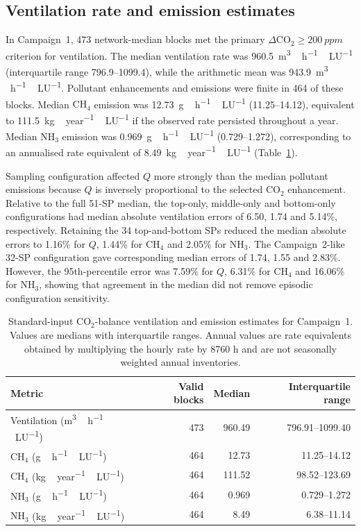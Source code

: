 \documentclass[12pt,a4paper]{article}
\begin{document}
\subsection{Ventilation rate and emission estimates}

In Campaign~1, 473 network-median blocks met the primary \(\Delta\mathrm{CO_2}\geq\SI{200}{ppm}\) criterion for ventilation. The median ventilation rate was \SI{960.5}{m^3\,h^{-1}\,LU^{-1}} (interquartile range 796.9--1099.4), while the arithmetic mean was \SI{943.9}{m^3\,h^{-1}\,LU^{-1}}. Pollutant enhancements and emissions were finite in 464 of these blocks. Median \(\mathrm{CH_4}\) emission was \SI{12.73}{g\,h^{-1}\,LU^{-1}} (11.25--14.12), equivalent to \SI{111.5}{kg\,year^{-1}\,LU^{-1}} if the observed rate persisted throughout a year. Median \(\mathrm{NH_3}\) emission was \SI{0.969}{g\,h^{-1}\,LU^{-1}} (0.729--1.272), corresponding to an annualised rate equivalent of \SI{8.49}{kg\,year^{-1}\,LU^{-1}} (Table~\ref{tab:emissions}).

Sampling configuration affected \(Q\) more strongly than the median pollutant emissions because \(Q\) is inversely proportional to the selected \(\mathrm{CO_2}\) enhancement. Relative to the full 51-SP median, the top-only, middle-only and bottom-only configurations had median absolute ventilation errors of 6.50, 1.74 and 5.14\%, respectively. Retaining the 34 top-and-bottom SPs reduced the median absolute errors to 1.16\% for \(Q\), 1.44\% for \(\mathrm{CH_4}\) and 2.05\% for \(\mathrm{NH_3}\). The Campaign~2-like 32-SP configuration gave corresponding median errors of 1.74, 1.55 and 2.83\%. However, the 95th-percentile error was 7.59\% for \(Q\), 6.31\% for \(\mathrm{CH_4}\) and 16.06\% for \(\mathrm{NH_3}\), showing that agreement in the median did not remove episodic configuration sensitivity.

\begin{table}[htbp]
\centering
\caption{Standard-input \(\mathrm{CO_2}\)-balance ventilation and emission estimates for Campaign~1. Values are medians with interquartile ranges. Annual values are rate equivalents obtained by multiplying the hourly rate by 8760 h and are not seasonally weighted annual inventories.}
\label{tab:emissions}
\small
\begin{tabular}{lrrr}
\toprule
Metric & Valid blocks & Median & Interquartile range\\
\midrule
Ventilation (\si{m^3\,h^{-1}\,LU^{-1}}) & 473 & 960.49 & 796.91--1099.40\\
\(\mathrm{CH_4}\) (\si{g\,h^{-1}\,LU^{-1}}) & 464 & 12.73 & 11.25--14.12\\
\(\mathrm{CH_4}\) (\si{kg\,year^{-1}\,LU^{-1}}) & 464 & 111.52 & 98.52--123.69\\
\(\mathrm{NH_3}\) (\si{g\,h^{-1}\,LU^{-1}}) & 464 & 0.969 & 0.729--1.272\\
\(\mathrm{NH_3}\) (\si{kg\,year^{-1}\,LU^{-1}}) & 464 & 8.49 & 6.38--11.14\\
\bottomrule
\end{tabular}
\end{table}
\end{document}
